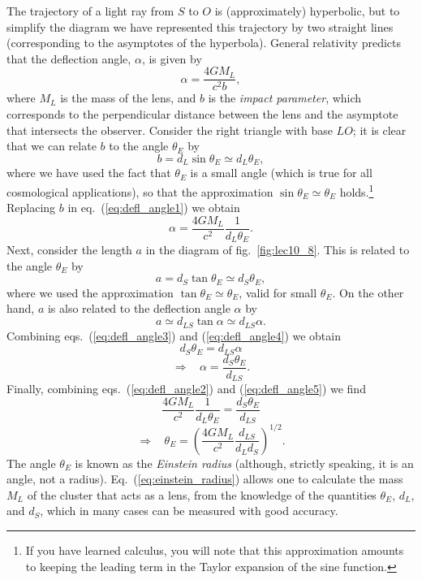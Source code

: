 \documentclass[11pt, a4paper,oneside,openright]{book}
\numberwithin{equation}{section}
\begin{document}
The trajectory of a light ray from $S$ to $O$ is (approximately) hyperbolic, but to simplify the diagram we have represented this trajectory by two straight lines (corresponding to the asymptotes of the hyperbola). General relativity predicts that the deflection angle, $\alpha$, is given by
\begin{equation} \label{eq:defl_angle1}
\alpha= \frac{4GM_L}{c^2 b},
\end{equation}
where $M_L$ is the mass of the lens, and $b$ is the {\it impact parameter}, which corresponds to the perpendicular distance between the lens and the asymptote that intersects the observer. Consider the right triangle with base $LO$; it is clear that we can relate $b$ to the angle $\theta_E$ by
\begin{equation}
b=d_L \sin\theta_E \simeq d_L \theta_E,
\end{equation}
where we have used the fact that $\theta_E$ is a small angle (which is true for all cosmological applications), so that the approximation $\sin\theta_E \simeq\theta_E$ holds.\footnote{If you have learned calculus, you will note that this approximation amounts to keeping the leading term in the Taylor expansion of the sine function.} Replacing $b$ in eq.\ (\ref{eq:defl_angle1}) we obtain
\begin{equation} \label{eq:defl_angle2}
\alpha= \frac{4GM_L}{c^2}\frac{1}{d_L \theta_E}.
\end{equation}
Next, consider the length $a$ in the diagram of fig.\ \ref{fig:lec10_8}. This is related to the angle $\theta_E$ by
\begin{equation} \label{eq:defl_angle3}
a=d_S \tan \theta_E \simeq d_S \theta_E,
\end{equation}
where we used the approximation $\tan\theta_E\simeq \theta_E$, valid for small $\theta_E$. On the other hand, $a$ is also related to the deflection angle $\alpha$ by
\begin{equation} \label{eq:defl_angle4}
a\simeq d_{LS} \tan\alpha \simeq d_{LS}\alpha.
\end{equation}
Combining eqs.\ (\ref{eq:defl_angle3}) and (\ref{eq:defl_angle4}) we obtain
\begin{equation}
d_S\theta_E = d_{LS}\alpha
\end{equation}
\begin{equation} \label{eq:defl_angle5}
\Rightarrow~~~~ \alpha = \frac{d_S\theta_E}{d_{LS}}.
\end{equation}
Finally, combining eqs.\ (\ref{eq:defl_angle2}) and (\ref{eq:defl_angle5}) we find
\begin{equation}
\frac{4GM_L}{c^2}\frac{1}{d_L \theta_E} = \frac{d_S\theta_E}{d_{LS}}
\end{equation}
\begin{equation} \label{eq:einstein_radius}
\Rightarrow~~~~\theta_E=\left( \frac{4GM_L}{c^2}\frac{d_{LS}}{d_L d_S} \right)^{1/2}.
\end{equation}
The angle $\theta_E$ is known as the {\it Einstein radius} (although, strictly speaking, it is an angle, not a radius). Eq.\ (\ref{eq:einstein_radius}) allows one to calculate the mass $M_L$ of the cluster that acts as a lens, from the knowledge of the quantities $\theta_E$, $d_L$, and $d_S$, which in many cases can be measured with good accuracy.
\end{document}
